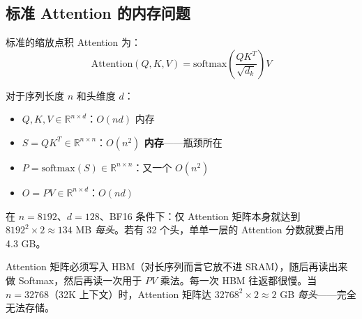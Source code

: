 \subsection{标准 Attention 的内存问题}
\label{the-standard-attention-memory-problem}

标准的缩放点积 Attention 为：
\[
\text{Attention}(Q, K, V) = \text{softmax}\!\left(\frac{QK^T}{\sqrt{d_k}}\right) V
\]

\begin{keybox}
对于序列长度 $n$ 和头维度 $d$：

\begin{itemize}
  \item $Q, K, V \in \mathbb{R}^{n \times d}$：$O(nd)$ 内存
  \item $S = QK^T \in \mathbb{R}^{n \times n}$：\textbf{$O(n^2)$ 内存}——瓶颈所在
  \item $P = \text{softmax}(S) \in \mathbb{R}^{n \times n}$：又一个 $O(n^2)$
  \item $O = PV \in \mathbb{R}^{n \times d}$：$O(nd)$
\end{itemize}

在 $n=8192$、$d=128$、BF16 条件下：仅 Attention 矩阵本身就达到 $8192^2 \times 2 \approx 134$ MB \emph{每头}。若有 32 个头，单单一层的 Attention 分数就要占用 4.3 GB。
\end{keybox}

\begin{intuitionbox}
Attention 矩阵必须写入 HBM（对长序列而言它放不进 SRAM），随后再读出来做 Softmax，然后再读一次用于 $PV$ 乘法。每一次 HBM 往返都很慢。当 $n=32768$（32K 上下文）时，Attention 矩阵达 $32768^2 \times 2 \approx 2$ GB \emph{每头}——完全无法存储。
\end{intuitionbox}

